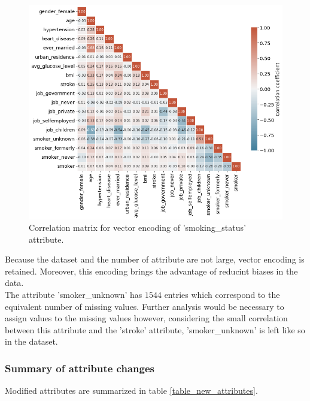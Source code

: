 \begin{figure}[H]
\centering
\includegraphics[scale=0.5]{../figures/correlationMatrix_smokingVectorEncoding.png}
\caption{Correlation matrix for vector encoding of 'smoking\_status' attribute.}
\label{figure_Xcorr_vector}
\end{figure}

Because the dataset and the number of attribute are not large, vector encoding is retained. Moreover, 
this encoding brings the advantage of reducint biases in the data.\\ 

The attribute 'smoker\_unknown' has $1544$ entries which correspond to the equivalent number of 
missing values. Further analysis would be necessary to assign values to the missing values however, 
considering the small correlation between this attribute and the 'stroke' attribute, 
'smoker\_unknown' is left like so in the dataset.


\subsubsection{Summary of attribute changes}
Modified attributes are summarized in table \ref{table_new_attributes}.

